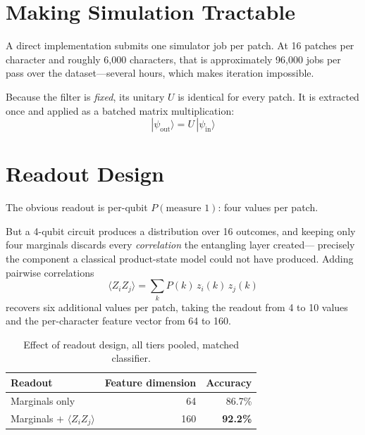 \documentclass[11pt,a4paper]{article}
\begin{document}
\section{Making Simulation Tractable}

A direct implementation submits one simulator job per patch. At 16 patches per
character and roughly 6{,}000 characters, that is approximately 96{,}000 jobs
per pass over the dataset---several hours, which makes iteration impossible.

Because the filter is \emph{fixed}, its unitary $U$ is identical for every patch.
It is extracted once and applied as a batched matrix multiplication:
\begin{equation}
|\psi_{\text{out}}\rangle = U\,|\psi_{\text{in}}\rangle
\end{equation}


\section{Readout Design}

The obvious readout is per-qubit $P(\text{measure }1)$: four values per patch.

But a 4-qubit circuit produces a distribution over 16 outcomes, and keeping only
four marginals discards every \emph{correlation} the entangling layer created---
precisely the component a classical product-state model could not have produced.
Adding pairwise correlations
\begin{equation}
\langle Z_i Z_j\rangle = \sum_k P(k)\, z_i(k)\, z_j(k)
\end{equation}
recovers six additional values per patch, taking the readout from 4 to 10 values
and the per-character feature vector from 64 to 160.

\begin{table}[h]
\centering
\caption{Effect of readout design, all tiers pooled, matched classifier.}
\begin{tabular}{@{}lrr@{}}
\toprule
Readout & Feature dimension & Accuracy \\
\midrule
Marginals only & 64 & 86.7\% \\
Marginals $+$ $\langle Z_i Z_j\rangle$ & 160 & \textbf{92.2\%} \\
\bottomrule
\end{tabular}
\end{table}
\end{document}
